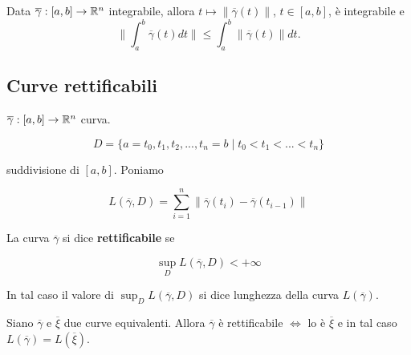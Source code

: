 \begin{theorem}
	Data $\overline{\gamma}: [a,b]\rightarrow \mathbb{R}^n$ integrabile, allora $t \mapsto \|\overline{\gamma}(t)\|$, $t\in[a,b]$, è integrabile e 
	\begin{equation*}
		\|\int_a^b\overline{\gamma}(t)dt\|\leq \int_a^b\|\overline{\gamma}(t)\|dt.
	\end{equation*}
\end{theorem}


\subsection{Curve rettificabili}

$\overline{\gamma}:[a,b]\rightarrow\mathbb{R}^n$ curva. 

$$D=\{a=t_0,t_1,t_2,...,t_n=b\mid t_0<t_1<...<t_n\}$$

suddivisione di $[a,b]$. Poniamo 

$$L(\overline{\gamma},D)=\sum_{i=1}^{n}\| \overline{\gamma}(t_i)-\overline{\gamma}(t_{i-1}) \|$$


\begin{definition}
	La curva $\overline{\gamma}$ si dice \textbf{rettificabile} se 
	
	$$\sup_D L(\overline{\gamma},D)<+\infty$$
	
	In tal caso il valore di $\sup_D L(\overline{\gamma},D)$ si dice lunghezza della curva $L(\overline{\gamma})$.
\end{definition}


\begin{proposition}
	
	\label{pr: pag 425}
	Siano $\overline{\gamma}$ e $\overline{\xi}$ due curve equivalenti. Allora $\overline{\gamma}$ è rettificabile $\Leftrightarrow $ lo è $\overline{\xi}$ e in tal caso $L(\overline{\gamma})=L(\overline{\xi})$.
\end{proposition}


